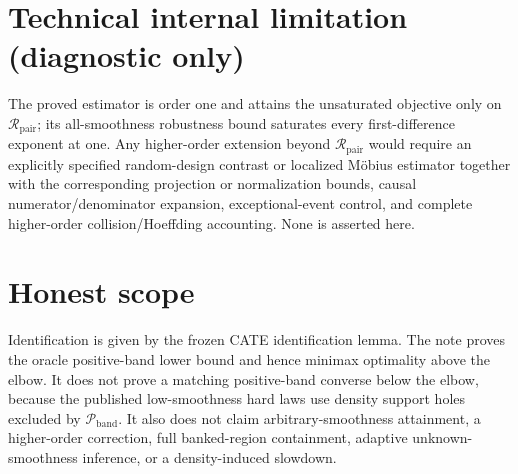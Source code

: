 \documentclass{article}
\begin{document}
\section*{Technical internal limitation (diagnostic only)}

The proved estimator is order one and attains the unsaturated objective only on \(\mathcal R_{\mathrm{pair}}\); its all-smoothness robustness bound saturates every first-difference exponent at one.  Any higher-order extension beyond \(\mathcal R_{\mathrm{pair}}\) would require an explicitly specified random-design contrast or localized M\"obius estimator together with the corresponding projection or normalization bounds, causal numerator/denominator expansion, exceptional-event control, and complete higher-order collision/Hoeffding accounting.  None is asserted here.

\section{Honest scope}

Identification is given by the frozen CATE identification lemma.  The note proves the oracle positive-band lower bound and hence minimax optimality above the elbow.  It does not prove a matching positive-band converse below the elbow, because the published low-smoothness hard laws use density support holes excluded by \(\mathcal P_{\mathrm{band}}\).  It also does not claim arbitrary-smoothness attainment, a higher-order correction, full banked-region containment, adaptive unknown-smoothness inference, or a density-induced slowdown.
\end{document}
